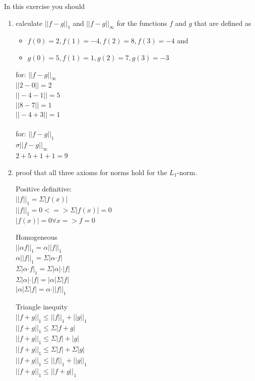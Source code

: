 \documentclass{WeSTassignment}
\begin{document}
In this exercise you should
\begin{enumerate}
\item calculate $||f - g||_1$ and $||f -g||_\infty$ for the functions $f$ and $g$ that are defined as \begin{itemize}
\item $f(0) = 2, f(1) = -4, f(2) = 8, f(3) = -4$ and 
\item $g(0) = 5, f(1) = 1, g(2) = 7, g(3) = -3$ \end{itemize}
for: $||f - g||_\infty$
\\$||2 - 0|| = 2$
\\$||-4 - 1|| = 5$
\\$||8 - 7|| = 1$
\\$||-4 + 3|| = 1$
\\\\for: $||f-g||_1$
\\ $\sigma ||f-g||_\infty$
\\ $2 + 5 + 1 + 1 = 9$
\item proof that all three axioms for norms hold for the $L_1$-norm.

Positive definitive:
\\ $||f||_1 = \Sigma|f(x)|$
\\ $||f||_1 = 0 <=> \Sigma |f(x)| = 0$
\\ $|f(x)| = 0 ∀x => f = 0$

Homogeneous
\\$||αf||_1 = α||f||_1$
\\$α||f||_1 = \Sigma |α·f|$
\\$\Sigma |α·f|_1 = \Sigma |α|·|f|$
\\$\Sigma |α|·|f| = |α|\Sigma|f|$
\\$|α|\Sigma|f| = α·||f||_1$

Triangle inequity
\\$||f+g||_1 \leq ||f||_1 + ||g||_1$
\\$||f+g||_1 \leq \Sigma |f+g|$
\\$||f+g||_1 \leq \Sigma |f| + |g|$
\\$||f+g||_1 \leq \Sigma|f| + \Sigma |g|$
\\$||f+g||_1 \leq ||f||_1 + ||g||_1$
\\$||f+g||_1 \leq ||f + g||_1$
\end{enumerate}
\end{document}

